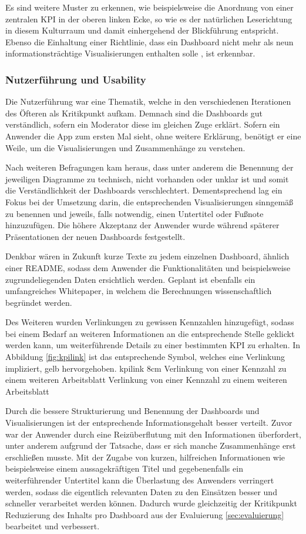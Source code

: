 Es sind weitere Muster zu erkennen, wie beispielsweise die Anordnung von einer zentralen \gls{KPI} in der oberen linken Ecke, so wie es der natürlichen Leserichtung in diesem Kulturraum und damit einhergehend der Blickführung entspricht.
Ebenso die Einhaltung einer Richtlinie, dass ein Dashboard nicht mehr als neun informationsträchtige Visualisierungen enthalten solle \cite[5.3]{Kertzel.2018}, ist erkennbar.

\subsubsection{Nutzerführung und Usability}
\label{subsub:usability}
Die Nutzerführung war eine Thematik, welche in den verschiedenen Iterationen des Öfteren als Kritikpunkt aufkam.
Demnach sind die Dashboards gut verständlich, sofern ein Moderator diese im gleichen Zuge erklärt.
Sofern ein Anwender die App zum ersten Mal sieht, ohne weitere Erklärung, benötigt er eine Weile, um die Visualisierungen und Zusammenhänge zu verstehen.

Nach weiteren Befragungen kam heraus, dass unter anderem die Benennung der jeweiligen Diagramme zu technisch, nicht vorhanden oder unklar ist und somit die Verständlichkeit der Dashboards verschlechtert. 
Dementsprechend lag ein Fokus bei der Umsetzung darin, die entsprechenden Visualisierungen sinngemäß zu benennen und jeweils, falls notwendig, einen Untertitel oder Fußnote hinzuzufügen.
Die höhere Akzeptanz der Anwender wurde während späterer Präsentationen der neuen Dashboards festgestellt. 

Denkbar wären in Zukunft kurze Texte zu jedem einzelnen Dashboard, ähnlich einer \glqq README\grqq{}, sodass dem Anwender die Funktionalitäten und beispielsweise zugrundeliegenden Daten ersichtlich werden.
Geplant ist ebenfalls ein umfangreiches Whitepaper, in welchem die Berechnungen wissenschaftlich begründet werden.

Des Weiteren wurden Verlinkungen zu gewissen Kennzahlen hinzugefügt, sodass bei einem Bedarf an weiteren Informationen an die entsprechende Stelle geklickt werden kann, um weiterführende Details zu einer bestimmten  \gls{KPI} zu erhalten.
In Abbildung \ref{fig:kpilink} ist das entsprechende Symbol, welches eine Verlinkung impliziert, gelb hervorgehoben.
\bild
{kpilink}
{8cm}
{Verlinkung von einer Kennzahl zu einem weiteren Arbeitsblatt}
{Verlinkung von einer Kennzahl zu einem weiteren Arbeitsblatt}

Durch die bessere Strukturierung und Benennung der Dashboards und Visualisierungen ist der entsprechende Informationsgehalt besser verteilt.
Zuvor war der Anwender durch eine Reizüberflutung mit den Informationen überfordert, unter anderem aufgrund der Tatsache, dass er sich manche Zusammenhänge erst erschließen musste.
Mit der Zugabe von kurzen, hilfreichen Informationen wie beispielsweise einem aussagekräftigen Titel und gegebenenfalls ein weiterführender Untertitel kann die Überlastung des Anwenders verringert werden, sodass die eigentlich relevanten Daten zu den Einsätzen besser und schneller verarbeitet werden können.
Dadurch wurde gleichzeitig der Kritikpunkt \glqq Reduzierung des Inhalts pro Dashboard\grqq{} aus der Evaluierung \ref{sec:evaluierung} bearbeitet und verbessert.

